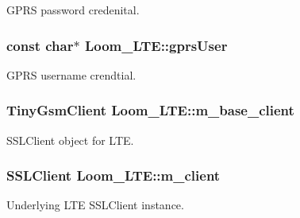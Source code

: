 G\+P\+RS password credenital. 

\subsubsection[{\texorpdfstring{gprs\+User}{gprsUser}}]{\setlength{\rightskip}{0pt plus 5cm}const char$\ast$ Loom\+\_\+\+L\+T\+E\+::gprs\+User\hspace{0.3cm}{\ttfamily [protected]}}\hypertarget{class_loom___l_t_e_aea1ba6a0a9f7ed65081b769f53d683ad}{}\label{class_loom___l_t_e_aea1ba6a0a9f7ed65081b769f53d683ad}


G\+P\+RS username crendtial. 

\subsubsection[{\texorpdfstring{m\+\_\+base\+\_\+client}{m_base_client}}]{\setlength{\rightskip}{0pt plus 5cm}Tiny\+Gsm\+Client Loom\+\_\+\+L\+T\+E\+::m\+\_\+base\+\_\+client\hspace{0.3cm}{\ttfamily [protected]}}\hypertarget{class_loom___l_t_e_a4413f26e14ac858125124311856a3a04}{}\label{class_loom___l_t_e_a4413f26e14ac858125124311856a3a04}


S\+S\+L\+Client object for L\+TE. 

\subsubsection[{\texorpdfstring{m\+\_\+client}{m_client}}]{\setlength{\rightskip}{0pt plus 5cm}S\+S\+L\+Client Loom\+\_\+\+L\+T\+E\+::m\+\_\+client\hspace{0.3cm}{\ttfamily [protected]}}\hypertarget{class_loom___l_t_e_a58e7db415a377eae5363ad7e740b4dfb}{}\label{class_loom___l_t_e_a58e7db415a377eae5363ad7e740b4dfb}


Underlying L\+TE S\+S\+L\+Client instance. 

